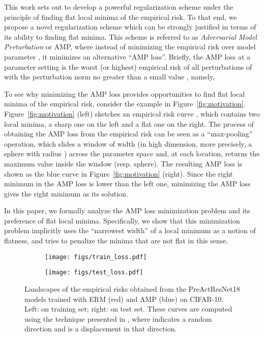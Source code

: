\documentclass[final]{cvpr}
\begin{document}
This work sets out to develop a powerful regularization scheme under the principle of finding flat local minima of the empirical risk. To that end, we propose a novel regularization scheme which can be strongly justified in terms of its ability to finding flat minima. This scheme is referred to as {\em Adversarial Model Perturbation} or AMP, where instead of minimizing the empirical risk  over model parameter , it minimizes an alternative ``AMP loss''. Briefly, the AMP loss  at a parameter setting  is the worst (or highest) empirical risk of all perturbations of  with the perturbation norm no greater than a small value , namely,


To see why minimizing the AMP loss provides opportunities to find flat local minima of the empirical risk, consider the example in Figure~\ref{fig:motivation}. Figure~\ref{fig:motivation} (left) sketches an empirical risk curve , which contains two local minima, a sharp one on the left and a flat one on the right. The process of obtaining the AMP loss from the empirical risk can be seen as a ``max-pooling'' operation, which slides a window of width  (in high dimension, more precisely, a sphere with radius ) across the parameter space and, at each location, returns the maximum value inside the window (resp. sphere). The resulting AMP loss is shown as the blue curve in Figure~\ref{fig:motivation} (right). Since the right minimum in the AMP loss is lower than the left one, minimizing the AMP loss gives the right minimum as its solution. 

In this paper, we formally analyze the AMP loss minimization problem and its preference of flat local minima. Specifically, we show that this minimization problem implicitly uses the ``narrowest width'' of a local minimum as a notion of flatness, and tries to penalize the minima that are not flat in this sense.

\begin{figure}[t]
\centering
\begin{subfigure}{0.48\columnwidth}\centering \texttt{[image: figs/train\_loss.pdf]}\end{subfigure}\begin{subfigure}{0.48\columnwidth}\centering \texttt{[image: figs/test\_loss.pdf]}\end{subfigure}\caption{Landscapes of the empirical risks obtained from the PreActResNet18 \cite{he2016identity} models trained with ERM (red) and AMP (blue) on CIFAR-10. Left: on training set; right: on test set. These curves are computed using the technique presented in \cite{li2018visualizing}, where  indicates a random direction and  is a displacement in that direction.}
\label{fig:validation}
\end{figure}
\end{document}
